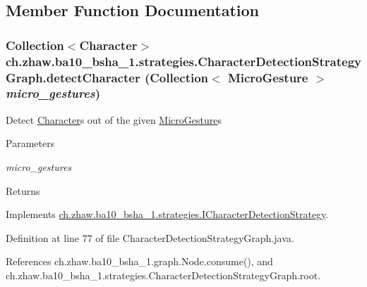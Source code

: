 \subsection{Member Function Documentation}
\hypertarget{classch_1_1zhaw_1_1ba10__bsha__1_1_1strategies_1_1CharacterDetectionStrategyGraph_af5d1202b6a9878b247cf4c5176102dd5}{
\subsubsection[{detectCharacter}]{\setlength{\rightskip}{0pt plus 5cm}Collection$<${\bf Character}$>$ ch.zhaw.ba10\_\-bsha\_\-1.strategies.CharacterDetectionStrategyGraph.detectCharacter (Collection$<$ {\bf MicroGesture} $>$ {\em micro\_\-gestures})}}
\label{classch_1_1zhaw_1_1ba10__bsha__1_1_1strategies_1_1CharacterDetectionStrategyGraph_af5d1202b6a9878b247cf4c5176102dd5}
Detect \hyperlink{classch_1_1zhaw_1_1ba10__bsha__1_1_1Character}{Character}s out of the given \hyperlink{}{MicroGesture}s


\begin{DoxyParams}{Parameters}
\item[{\em micro\_\-gestures}]\end{DoxyParams}
\begin{DoxyReturn}{Returns}

\end{DoxyReturn}


Implements \hyperlink{interfacech_1_1zhaw_1_1ba10__bsha__1_1_1strategies_1_1ICharacterDetectionStrategy_a994429a274e75c471d18aca69dce2c1d}{ch.zhaw.ba10\_\-bsha\_\-1.strategies.ICharacterDetectionStrategy}.

Definition at line 77 of file CharacterDetectionStrategyGraph.java.

References ch.zhaw.ba10\_\-bsha\_\-1.graph.Node.consume(), and ch.zhaw.ba10\_\-bsha\_\-1.strategies.CharacterDetectionStrategyGraph.root.

